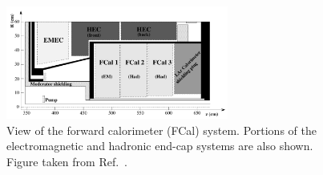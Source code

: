 \begin{figure}[!htb]
    \begin{center}
        \includegraphics[width=0.65\textwidth]{figures/chapter2/calorimeters/atlas_fcal}
        \caption{
            View of the forward calorimeter (FCal) system. Portions of the electromagnetic
            and hadronic end-cap systems are also shown.
            Figure taken from Ref.~\cite{Artamonov_2008}.
        }
        \label{fig:fcal}
    \end{center}
\end{figure}
